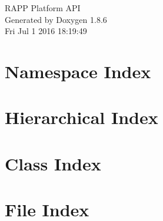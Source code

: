 \documentclass[twoside]{book}
\newcommand{\clearemptydoublepage}{%
  \newpage{\pagestyle{empty}\cleardoublepage}%
}
\begin{document}
\hypersetup{pageanchor=false}
\begin{titlepage}
\vspace*{7cm}
\begin{center}%
{\Large R\-A\-P\-P Platform A\-P\-I }\\
\vspace*{1cm}
{\large Generated by Doxygen 1.8.6}\\
\vspace*{0.5cm}
{\small Fri Jul 1 2016 18:19:49}\\
\end{center}
\end{titlepage}
\clearemptydoublepage
\tableofcontents
\clearemptydoublepage
{}
\hypersetup{pageanchor=true}

\chapter{Namespace Index}

\chapter{Hierarchical Index}

\chapter{Class Index}

\chapter{File Index}

\end{document}
